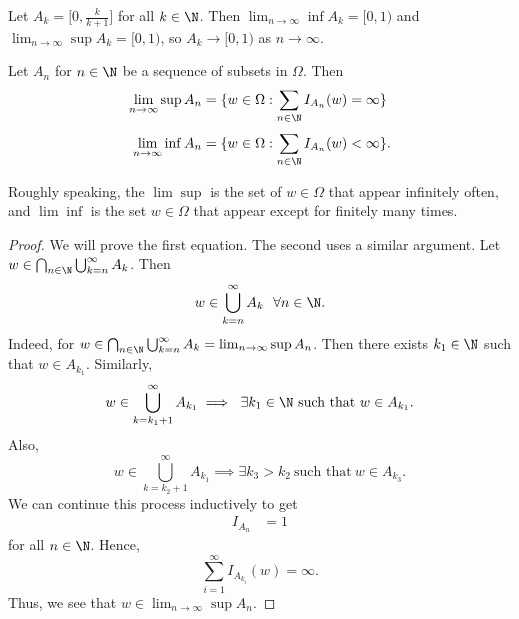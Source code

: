 \begin{eg}
    Let \( {A}_{k} = \Big[ 0, \frac{ k  }{  k + 1  } \Big] \) for all \( k \in \N \). Then \( \lim_{ n \to \infty  }  \inf {A}_{k} = [0,1) \) and \( \lim_{ n \to \infty   }  \sup {A}_{k} = [0,1) \), so \( {A}_{k} \to [0,1) \) as \( n \to \infty  \).
\end{eg}

\begin{prop}[ ]
   Let \( {A}_{n} \) for \( n \in \N  \) be a sequence of subsets in \( \Omega  \). Then 
   \begin{align*}
       \lim_{ n \to \infty  }  \sup {A}_{n} &= \{ w \in \Omega : \sum_{ n \in \N } {I}_{{A}_{n}}(w) = \infty   \}  \\
       \lim_{ n \to \infty  }  \inf {A}_{n} &= \{ w \in \Omega : \sum_{ n \in \N  }^{  } {I}_{{A}_{n}} (w) < \infty \}.
   \end{align*}
\end{prop}

Roughly speaking, the \( \lim \sup  \) is the set of \( w \in \Omega  \) that appear infinitely often, and \( \lim \inf  \) is the set \( w \in \Omega  \) that appear except for finitely many times.

\begin{proof}
We will prove the first equation. The second uses a similar argument. Let \( w \in \bigcap_{ n \in \N  }^{  }  \bigcup_{ k = n  }^{ \infty  }  {A}_{k}  \). Then 
\[  w \in \bigcup_{ k = n  }^{ \infty  }  {A}_{k} \ \ \forall n \in \N. \]
Indeed, for \( w \in \bigcap_{  n \in \N  }^{  }  \bigcup_{ k = n  }^{ \infty  }  {A}_{k} = \lim_{ n \to \infty  }  \sup {A}_{n}  \). Then there exists \( {k}_{1} \in \N  \) such that \( w \in {A}_{{k}_{1}} \). Similarly, 
\[  w \in \bigcup_{ k = {k}_{1} + 1  }^{ \infty  } {A}_{{k}_{1}} \implies \ \exists {k}_{1} \in \N \ \text{such that} \ w \in {A}_{{k}_{1}}. \] 
Also, 
\[  w \in \bigcup_{ k = {k}_{2} + 1  }^{  \infty  }  {A}_{{k}_{1}}  \implies \exists {k}_{3} > {k }_{2} \ \text{such that} \ w \in {A}_{{k}_{3}}. \]
We can continue this process inductively to get 
\begin{align*}
    {I}_{{A}_{n}} &= 1  
\end{align*}
for all \( n \in \N \). Hence, 
\[  \sum_{ i=1  }^{ \infty  } {I}_{{A}_{{k }_{i}}}(w) = \infty.  \]
Thus, we see that \( w \in \lim_{ n \to \infty  }  \sup {A}_{n} \).
\end{proof} 

